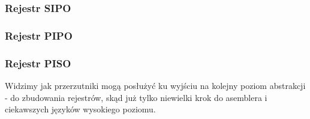 \documentclass[12pt,a4paper]{article}
\begin{document}
\subsubsection{Rejestr SIPO}

\subsubsection{Rejestr PIPO}

\subsubsection{Rejestr PISO}

Widzimy jak przerzutniki mogą posłużyć ku wyjściu na kolejny poziom abstrakcji - do zbudowania rejestrów, skąd już tylko niewielki krok do asemblera i ciekawszych języków wysokiego poziomu.
\end{document}
